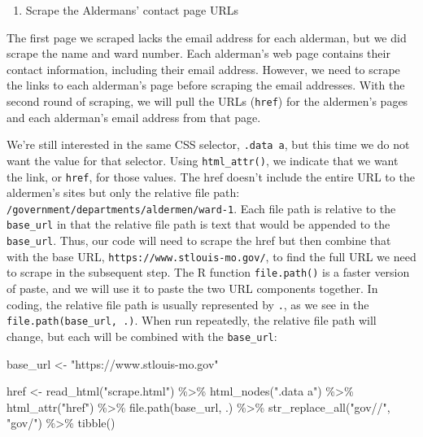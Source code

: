 \documentclass[
  krantz2]{krantz}
\makeatletter
\newenvironment{Shaded}{\begin{snugshade}}{\end{snugshade}}
\newcommand{\FunctionTok}[1]{\textcolor[rgb]{0,0,0}{#1}}
\newcommand{\NormalTok}[1]{#1}
\newcommand{\OtherTok}[1]{\textcolor[rgb]{0.37,0.37,0.37}{#1}}
\newcommand{\SpecialCharTok}[1]{\textcolor[rgb]{0,0,0}{#1}}
\newcommand{\StringTok}[1]{\textcolor[rgb]{0.5,0.5,0.5}{#1}}
\providecommand{\tightlist}{%
  \setlength{\itemsep}{0pt}\setlength{\parskip}{0pt}}
\newenvironment{kframe}{%
\medskip{}
\setlength{\fboxsep}{.8em}
 \def\at@end@of@kframe{}%
 \ifinner\ifhmode%
  \def\at@end@of@kframe{\end{minipage}}%
  \begin{minipage}{\columnwidth}%
 \fi\fi%
 \def\FrameCommand##1{\hskip\@totalleftmargin \hskip-\fboxsep
 \colorbox{shadecolor}{##1}\hskip-\fboxsep
     \hskip-\linewidth \hskip-\@totalleftmargin \hskip\columnwidth}%
 \MakeFramed {\advance\hsize-\width
   \@totalleftmargin\z@ \linewidth\hsize
   \@setminipage}}%
 {\par\unskip\endMakeFramed%
 \at@end@of@kframe}
\renewenvironment{Shaded}{\begin{kframe}}{\end{kframe}}
\makeatother
\begin{document}
\begin{enumerate}
\def\labelenumi{\arabic{enumi}.}
\tightlist
\item
  Scrape the Aldermans' contact page URLs
\end{enumerate}

The first page we scraped lacks the email address for each alderman, but we did scrape the name and ward number. Each alderman's web page contains their contact information, including their email address. However, we need to scrape the links to each alderman's page before scraping the email addresses. With the second round of scraping, we will pull the URLs (\texttt{href}) for the aldermen's pages and each alderman's email address from that page.

We're still interested in the same CSS selector, \texttt{.data\ a}, but this time we do not want the value for that selector. Using \texttt{html\_attr()}, we indicate that we want the link, or \texttt{href}, for those values. The href doesn't include the entire URL to the aldermen's sites but only the relative file path: \texttt{/government/departments/aldermen/ward-1}. Each file path is relative to the \texttt{base\_url} in that the relative file path is text that would be appended to the \texttt{base\_url}. Thus, our code will need to scrape the href but then combine that with the base URL, \texttt{https://www.stlouis-mo.gov/}, to find the full URL we need to scrape in the subsequent step. The R function \texttt{file.path()} is a faster version of paste, and we will use it to paste the two URL components together. In coding, the relative file path is usually represented by \texttt{.}, as we see in the \texttt{file.path(base\_url,\ .)}. When run repeatedly, the relative file path will change, but each will be combined with the \texttt{base\_url}:

\begin{Shaded}
\begin{Highlighting}[]
\NormalTok{base\_url }\OtherTok{\textless{}{-}} \StringTok{"https://www.stlouis{-}mo.gov"}

\NormalTok{href }\OtherTok{\textless{}{-}} \FunctionTok{read\_html}\NormalTok{(}\StringTok{"scrape.html"}\NormalTok{) }\SpecialCharTok{\%\textgreater{}\%}
  \FunctionTok{html\_nodes}\NormalTok{(}\StringTok{".data a"}\NormalTok{) }\SpecialCharTok{\%\textgreater{}\%}
  \FunctionTok{html\_attr}\NormalTok{(}\StringTok{"href"}\NormalTok{) }\SpecialCharTok{\%\textgreater{}\%}
  \FunctionTok{file.path}\NormalTok{(base\_url, .) }\SpecialCharTok{\%\textgreater{}\%}
  \FunctionTok{str\_replace\_all}\NormalTok{(}\StringTok{"gov//"}\NormalTok{, }\StringTok{"gov/"}\NormalTok{) }\SpecialCharTok{\%\textgreater{}\%}
  \FunctionTok{tibble}\NormalTok{()}
\end{Highlighting}
\end{Shaded}
\end{document}
